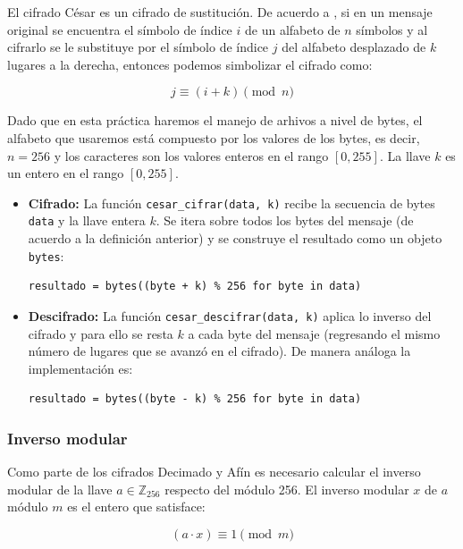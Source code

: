 \documentclass[12pt, a4paper]{article}
\begin{document}
El cifrado César es un cifrado de sustitución. De acuerdo a \cite{notas_galaviz}, si en un mensaje original se
encuentra el símbolo de índice $i$ de un alfabeto de $n$ símbolos y al cifrarlo se le substituye por el símbolo
de índice $j$ del alfabeto desplazado de $k$ lugares a la derecha, entonces podemos simbolizar el cifrado como:

\[
    j \equiv (i + k) \pmod n
\]

Dado que en esta práctica haremos el manejo de arhivos a nivel de bytes, el alfabeto que usaremos está compuesto 
por los valores de los bytes, es decir, $n = 256$ y los caracteres son los valores enteros en el rango $[0, 255]$. 
La llave $k$ es un entero en el rango $[0, 255]$.

\begin{itemize}

    \item \textbf{Cifrado:} La función \texttt{cesar\_cifrar(data, k)} recibe la secuencia de bytes \texttt{data}
y la llave entera $k$. Se itera sobre todos los bytes del mensaje (de acuerdo a la definición anterior) y se construye 
el resultado como un objeto \texttt{bytes}:

\begin{verbatim}
resultado = bytes((byte + k) % 256 for byte in data)
\end{verbatim}

    \item \textbf{Descifrado:} La función \texttt{cesar\_descifrar(data, k)} aplica lo inverso del cifrado y para ello
    se resta $k$ a cada byte del mensaje (regresando el mismo número de lugares que se avanzó en el cifrado). 
    De manera análoga la implementación es:

\begin{verbatim}
resultado = bytes((byte - k) % 256 for byte in data)
\end{verbatim}

\end{itemize}

\subsubsection*{Inverso modular}

Como parte de los cifrados Decimado y Afín es necesario calcular el
inverso modular de la llave $a \in \mathbb{Z}_{256}$ respecto del módulo 256.
El inverso modular $x$ de $a$ módulo $m$ es el entero que satisface:

\[
    (a \cdot x) \equiv 1 \pmod m
\]
\end{document}
